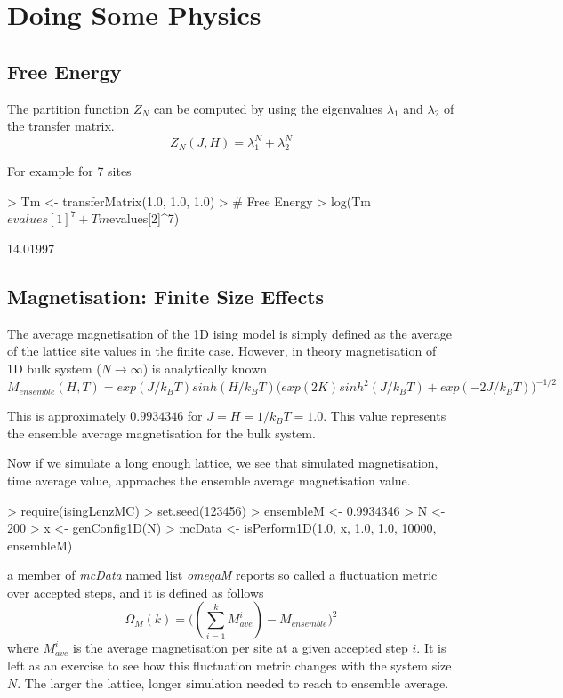 \documentclass[a4paper]{article}
\begin{document}
\section{Doing Some Physics}
\subsection{Free Energy}
The partition function $Z_{N}$ can be computed by using the eigenvalues $\lambda_{1}$ and $\lambda_{2}$ of the transfer matrix. 
$$Z_{N}(J, H) = \lambda_{1}^{N} +  \lambda_{2}^{N} $$

For example for 7 sites

\begin{Schunk}
\begin{Sinput}
> Tm <- transferMatrix(1.0, 1.0, 1.0)
> # Free Energy
> log(Tm$evalues[1]^7 + Tm$evalues[2]^7)
\end{Sinput}
\begin{Soutput}
[1] 14.01997
\end{Soutput}
\end{Schunk}
\subsection{Magnetisation: Finite Size Effects}

The average magnetisation of the 1D ising model is simply defined as the average of the lattice site values in the finite case.
However, in theory magnetisation of 1D bulk system ($N \to \infty $) is analytically known
$$ M_{ensemble}(H, T) = exp(J/k_{B} T) sinh(H/k_{B} T) \Big( exp(2K) sinh^{2}(J/k_{B}T) + exp(-2J/k_{B}T) \Big)^{-1/2}$$

This is approximately $0.9934346$ for $J=H=1/k_{B}T=1.0$. This value represents the ensemble average magnetisation for the bulk system.

Now if we simulate a long enough lattice, we see that simulated magnetisation, time average value,  approaches the ensemble average magnetisation value.
\begin{Schunk}
\begin{Sinput}
> require(isingLenzMC)
> set.seed(123456)
> ensembleM <- 0.9934346
> N         <- 200
> x         <- genConfig1D(N)
> mcData    <- isPerform1D(1.0, x, 1.0, 1.0, 10000, ensembleM)
\end{Sinput}
\end{Schunk}
a member of {\it mcData} named list {\it omegaM} reports so called a fluctuation metric over accepted steps, and it is defined as 
follows
$$ \Omega_{M}(k) = \Big( (\sum_{i=1}^{k} M_{ave}^{i}) - M_{ensemble} \Big)^{2} $$
where $M_{ave}^{i}$ is the average magnetisation per site at a given accepted step $i$. It is left as an exercise to see how this 
fluctuation metric changes with the system size $N$. The larger the lattice, longer simulation needed to reach to ensemble average.
\end{document}
